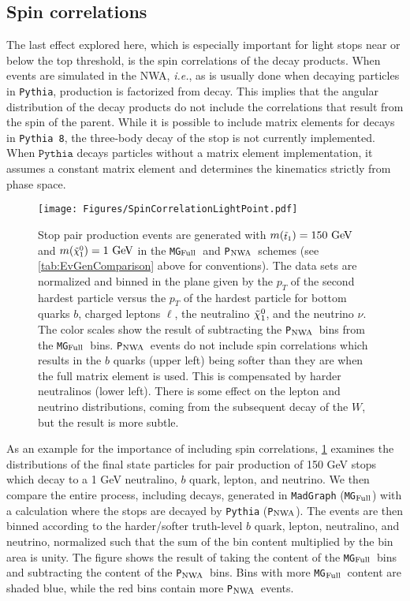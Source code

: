 \documentclass[a4paper,12pt]{article}
\newcommand{\gev}{~\text{GeV}}
\newcommand{\pythia}{\texttt{P}$_{\rm{NWA}}$}
\newcommand{\mg}{\texttt{MG}$_{\rm{Full}}$}
\def\mnino{\ensuremath{m({\footnotesize \ninoone})}}
\def\mstop{\ensuremath{m({\footnotesize \stopone})}}
\def\stopone{\ensuremath{\mathchoice%
      {\displaystyle\raise.0ex\hbox{$\displaystyle\tilde t_1$}}%
         {\textstyle\raise-.2ex\hbox{$\textstyle\tilde t_1$}}%
       {\scriptstyle\raise.0ex\hbox{$\scriptstyle\tilde t_1$}}%
 {\scriptscriptstyle\raise.0ex\hbox{$\scriptscriptstyle\tilde t_1$}}}}
\def\ninoone{\ensuremath{\mathchoice%
      {\displaystyle\raise.4ex\hbox{$\displaystyle\tilde\chi^0_1$}}%
         {\textstyle\raise.1ex\hbox{$\textstyle\tilde\chi^0_1$}}%
       {\scriptstyle\raise.3ex\hbox{$\scriptstyle\tilde\chi^0_1$}}%
 {\scriptscriptstyle\raise.3ex\hbox{$\scriptscriptstyle\tilde\chi^0_1$}}}}
\begin{document}
\subsection{Spin correlations}
\label{sec:SpinCorr}

The last effect explored here, which is especially important for light stops near or below the top threshold, is the spin correlations of the decay products. When events are simulated in the NWA, \emph{i.e.}, as is usually done when decaying particles in \texttt{Pythia}, production is factorized from decay.  This implies that the angular distribution of the decay products do not include the correlations that result from the spin of the parent.  While it is possible to include matrix elements for decays in \texttt{Pythia 8}, the three-body decay of the stop is not currently implemented.  When $\texttt{Pythia}$ decays particles without a matrix element implementation, it assumes a constant matrix element and determines the kinematics strictly from phase space. 

\begin{figure}[t]
\begin{center}
\texttt{[image: Figures/SpinCorrelationLightPoint.pdf]}
\caption{Stop pair production events are generated with $\mstop = 150 \gev$ and $\mnino = 1\gev$ in the \mg\ and \pythia\ schemes (see \cref{tab:EvGenComparison} above for conventions).  The data sets are normalized and binned in the plane given by the $p_T$ of the second hardest particle versus the $p_T$ of the hardest particle for bottom quarks $b$, charged leptons $\ell$, the neutralino $\ninoone$, and the neutrino $\nu$.  The color scales show the result of subtracting the \pythia\ bins from the \mg\ bins. \pythia\ events do not include spin correlations which results in the $b$ quarks (upper left) being softer than they are when the full matrix element is used. This is compensated by harder neutralinos (lower left). There is some effect on the lepton and neutrino distributions, coming from the subsequent decay of the $W$, but the result is more subtle.}
\label{fig:Distributions}
\end{center}
\end{figure}

As an example for the importance of including spin correlations, \cref{fig:Distributions} examines the distributions of the final state particles for pair production of 150 GeV stops which decay to a 1 GeV neutralino, $b$ quark, lepton, and neutrino. We then compare the entire process, including decays, generated in \texttt{MadGraph} (\mg) with a calculation where the stops are decayed by \texttt{Pythia} (\pythia). The events are then binned according to the harder/softer truth-level $b$ quark, lepton, neutralino, and neutrino, normalized such that the sum of the bin content multiplied by the bin area is unity. The figure shows the result of taking the content of the \mg\ bins and subtracting the content of the \pythia\ bins. Bins with more \mg\ content are shaded blue, while the red bins contain more \pythia\ events.
\end{document}
